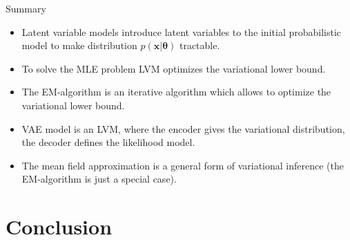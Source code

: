 \documentclass{beamer}
\newcommand{\bx}{\mathbf{x}}
\newcommand{\btheta}{\boldsymbol{\theta}}
\begin{document}
\begin{frame}{Summary}

\begin{itemize}
	\item Latent variable models introduce latent variables to the initial probabilistic model to make distribution $p(\bx | \btheta)$ tractable.
	\item To solve the MLE problem LVM optimizes the variational lower bound.
	\item The EM-algorithm is an iterative algorithm which allows to optimize the variational lower bound.
	\item VAE model is an LVM, where the encoder gives the variational distribution, the decoder defines the likelihood model.
	\item The mean field approximation is a general form of variational inference (the EM-algorithm is just a special case).
\end{itemize}
\end{frame}
\section{Conclusion}
\end{document}
